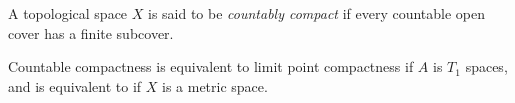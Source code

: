 \documentclass{article}
\begin{document}
A topological space $X$ is said to be \emph{countably compact} if every countable open cover has a finite subcover.

Countable compactness is equivalent to limit point compactness if $A$ is $T_1$ spaces, and is equivalent to  if $X$ is a metric space.

\end{document}
